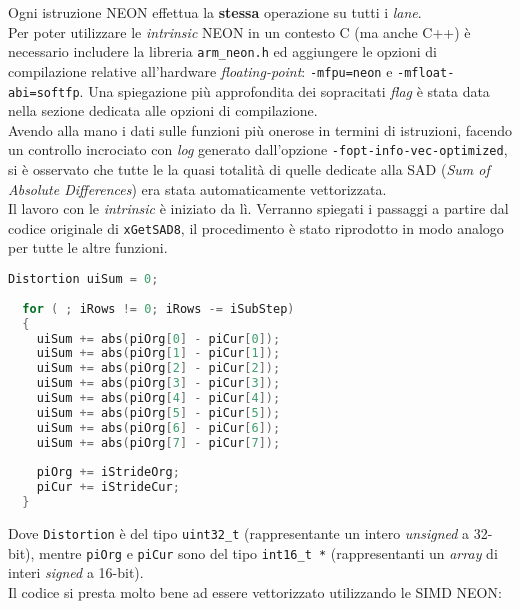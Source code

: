 Ogni istruzione NEON effettua la \textbf{stessa} operazione su tutti i 
\emph{lane}.\\

Per poter utilizzare le \emph{intrinsic} NEON in un contesto C (ma anche C++) è 
necessario includere la libreria \verb|arm_neon.h| ed aggiungere le opzioni di 
compilazione relative all'hardware \emph{floating-point}: \verb|-mfpu=neon| e 
\verb|-mfloat-abi=softfp|. Una spiegazione più approfondita dei sopracitati 
\emph{flag} è stata data nella sezione dedicata alle opzioni di compilazione.\\

Avendo alla mano i dati sulle funzioni più onerose in termini di istruzioni, 
facendo un controllo incrociato con \emph{log} generato dall'opzione 
\verb|-fopt-info-vec-optimized|, si è osservato che tutte le la quasi totalità 
di quelle dedicate alla SAD (\emph{Sum of Absolute Differences}) era stata 
automaticamente vettorizzata.\\

Il lavoro con le \emph{intrinsic} è iniziato da lì. Verranno spiegati i 
passaggi a partire dal codice originale di \verb|xGetSAD8|, il procedimento è 
stato riprodotto in modo analogo per tutte le altre funzioni.\\

\begin{lstlisting}[language=C]
  Distortion uiSum = 0;
  
  for ( ; iRows != 0; iRows -= iSubStep)
  {
    uiSum += abs(piOrg[0] - piCur[0]);
    uiSum += abs(piOrg[1] - piCur[1]);
    uiSum += abs(piOrg[2] - piCur[2]);
    uiSum += abs(piOrg[3] - piCur[3]);
    uiSum += abs(piOrg[4] - piCur[4]);
    uiSum += abs(piOrg[5] - piCur[5]);
    uiSum += abs(piOrg[6] - piCur[6]);
    uiSum += abs(piOrg[7] - piCur[7]);
    
    piOrg += iStrideOrg;
    piCur += iStrideCur;
  }
\end{lstlisting}

Dove \verb|Distortion| è del tipo \verb|uint32_t| (rappresentante un intero 
\emph{unsigned} a 32-bit), mentre \verb|piOrg| e \verb|piCur| sono del tipo 
\verb|int16_t *| (rappresentanti un \emph{array} di interi \emph{signed} a 
16-bit).\\

Il codice si presta molto bene ad essere vettorizzato utilizzando le SIMD NEON:

